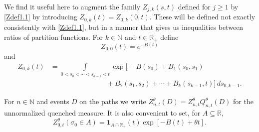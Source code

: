 \documentclass[11pt]{amsart}
\numberwithin{equation}{section}
\theoremstyle{remark}
\begin{document}
We find it useful here  to augment the family $Z_{j,k}(s,t)$ defined
for $j\ge 1$  by \eqref{Zdef1.1}
by introducing   $Z_{0,k}(t)=Z_{0,k}(0,t)$. These will be defined not exactly consistently 
with \eqref{Zdef1.1}, but in a manner that gives us inequalities between ratios of 
partition functions.  
For $k\in {\mathbb{N}}$ and $t\in{\mathbb{R}}_+$ define 
\begin{equation}  Z_{0,0}(t)=e^{-B(t)} \label{Zdef1.01} \end{equation}
and 
 \begin{equation}\begin{aligned} Z_{0,k}(t) &= 
\int\limits_{0<s_{0}<\dotsm<s_{k-1}<t}  \exp\bigl[ -B(s_0) +B_1(s_0,s_1) 
\\[4pt]   &\qquad \qquad \qquad \qquad  
+B_{2}(s_1,s_{2})
+\dotsm + B_k(s_{k-1},t)\bigr] \,ds_{0,k-1}.
\end{aligned}\label{Zdef1.02}\end{equation}
 
For $n\in{\mathbb{N}}$ and events $D$ on the paths 
 we write $Z_{n,t}^{\theta}(D)=Z_{n,t}^{\theta} Q_{n,t}^{\theta}(D)$ for the unnormalized
quenched measure.  It is also convenient  to set, for $A\subseteq{\mathbb{R}}$,  
\begin{equation} Z_{0,t}^{\theta}(\sigma_0\in A)= {\mathbf{1}}_{A\cap{\mathbb{R}}_+}(t) \exp[-B(t)+{\theta} t].  \label{0conv}\end{equation} 
\end{document}
